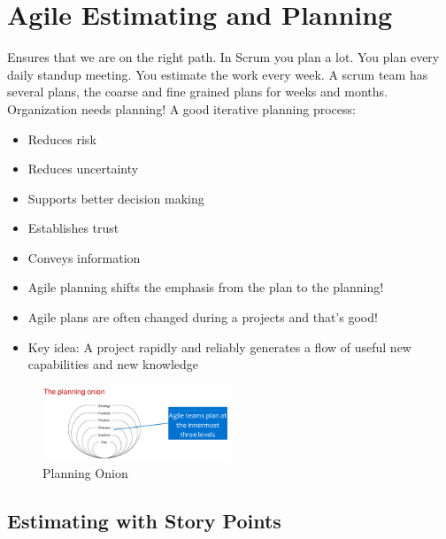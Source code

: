 \hypertarget{agile-estimating-and-planning}{%
\section{Agile Estimating and
Planning}\label{agile-estimating-and-planning}}

Ensures that we are on the right path. In Scrum you plan a lot. You plan every daily standup meeting. You estimate the work every week. A scrum team has several plans, the coarse and fine grained plans for weeks and months. Organization needs planning!
A good iterative planning process:

\begin{itemize}
\tightlist
\item
  Reduces risk
\item
  Reduces uncertainty
\item
  Supports better decision making
\item
  Establishes trust
\item
  Conveys information
\end{itemize}

\begin{itemize}
\tightlist
\tightlist
\item
  Agile planning shifts the emphasis from the plan to the planning!
\item
  Agile plans are often changed during a projects and that's good!
\item
  Key idea: A project rapidly and reliably generates a flow of useful
  new capabilities and new knowledge
\end{itemize}

\begin{figure}[H]
\centering
\includegraphics[width=0.5\textwidth]{figures/planningOnion.png}
\caption{Planning Onion}
\end{figure}

\hypertarget{estimating-with-story-points}{%
\subsection{Estimating with Story
Points}\label{estimating-with-story-points}}

